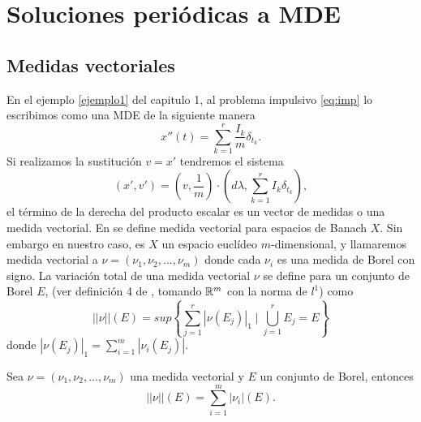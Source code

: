 \chapter{Soluciones periódicas a MDE}




\section{Medidas vectoriales}

En el  ejemplo \ref{ejemplo1} del capitulo 1, al  problema impulsivo \eqref{eq:imp} lo escribimos como una MDE de la siguiente manera
\begin{equation*}
	x''(t)=\sum_{k=1}^{r}\dfrac{I_k}{m}\delta_{t_k}.
\end{equation*}
Si  realizamos la sustitución $v=x'$ tendremos el sistema
\begin{equation*}
	\left( x',v'\right) =\left( v ,\dfrac{1}{m}\right) \cdot \left( d\lambda, \displaystyle\sum_{k=1}^{r}I_k\delta_{t_k}\right) , 
\end{equation*}
el término de la derecha del producto escalar es un vector de medidas o una medida vectorial.  En \cite{distel} se define medida vectorial para espacios de Banach $X$. Sin embargo en nuestro caso, es $X$  un espacio euclídeo  $m$-dimensional, y llamaremos medida vectorial a $\nu=(\nu_1,\nu_2,...,\nu_m)$ donde cada $\nu_i$ es una medida de Borel con signo.  La variación total de una medida vectorial $\nu$ se define para un conjunto de Borel $E$, (ver definición 4 de \cite{distel}, tomando $\mathbb{R}^m$ con la norma de $l^1$) como 
$$||\nu||(E)=sup\left\{ \sum_{j=1}^r |\nu(E_j)| _1 \mid \bigcup_{j=1}^rE_j=E\right\}$$
donde $|\nu(E_j)|_1=\displaystyle\sum_{i=1}^m|\nu_i(E_j)|$.
\begin{lem}
    Sea $\nu=(\nu_1,\nu_2,...,\nu_m)$ una medida vectorial y $E$ un conjunto de Borel, entonces
    \begin{equation}
        ||\nu||(E)=\sum_{i=1}^{m}|\nu_i|(E). 
\end{equation}\index[Simbolo]{$\Vert \nu \Vert$}
\end{lem}
